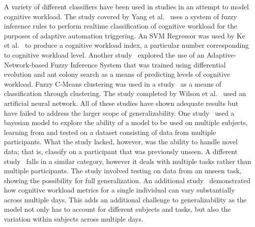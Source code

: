\documentclass[11pt]{article}
\begin{document}
A variety of different classifiers have been used in studies in an attempt to model cognitive workload. The study covered by Yang et al.~\cite{Yang} uses a system of fuzzy inference rules to perform realtime classification of cognitive workload for the purposes of adaptive automation triggering. An SVM Regressor was used by Ke et al.~\cite{Ke} to produce a cognitive workload index, a particular number corresponding to cognitive workload level. Another study~\cite{Wang_R} explored the use of an Adaptive-Network-based Fuzzy Inference System that was trained using differential evolution and ant colony search as a means of predicting levels of cognitive workload. Fuzzy C-Means clustering was used in a study~\cite{Zhang} as a means of classification through clustering. The study completed by Wilson et al.~\cite{Wilson} used an artificial neural network. All of these studies have shown adequate results but have failed to address the larger scope of generalizability. One study~\cite{Wang_Z} used a bayesian model to explore the ability of a model to be used on multiple subjects, learning from and tested on a dataset consisting of data from multiple participants. What the study lacked, however, was the ability to handle novel data; that is, classify on a participant that was previously unseen. A different study~\cite{Ke} falls in a similar category, however it deals with multiple tasks rather than multiple participants. The study involved testing on data from an unseen task,  showing the possibility for full generalization. An additional study~\cite{Christensen} demonstrated how cognitive workload metrics for a single individual can vary substantially across multiple days. This adds an additional challenge to generalizability as the model not only has to account for different subjects and tasks, but also the variation within subjects across multiple days.
\end{document}
